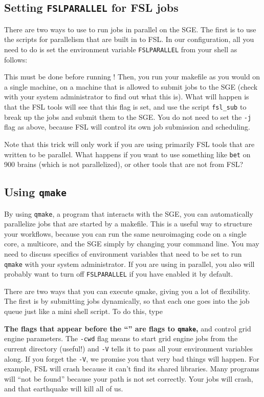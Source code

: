 \subsection{Setting \texttt{FSLPARALLEL} for FSL jobs}

There are two ways to use \maken{} to run jobs in parallel on the SGE. The first is to use the scripts for parallelism that are built in to FSL. In our configuration, all you need to do is set the environment variable \texttt{FSLPARALLEL} from your shell as follows:

This must be done before running \maken! Then, you run your makefile as you would on a single machine, on a machine that is allowed to submit jobs to the SGE (check with your system administrator to find out what this is). What will happen is that the FSL tools will see that this flag is set, and use the script \texttt{fsl_sub} to break up the jobs and submit them to the SGE. You do not need to set the \texttt{-j} flag as above, because FSL will control its own job submission and scheduling. 

Note that this trick will only work if you are using primarily FSL tools that are written to be parallel. What happens if you want to use something like \texttt{bet} on 900 brains (which is not parallelized), or other tools that are not from FSL?

\subsection{Using \texttt{qmake}}

By using \texttt{qmake}, a program that interacts with the SGE, you can automatically parallelize jobs that are started by a makefile. This is a useful way to structure your workflows, because you can run the same neuroimaging code on a single core, a multicore, and the SGE simply by changing your command line. You may need to discuss specifics of environment variables that need to be set to run \texttt{qmake} with your system administrator. If you are using \maken{} in parallel, you also will probably want to turn off \texttt{FSLPARALLEL} if you have enabled it by default.

There are two ways that you can execute qmake, giving you a lot of flexibility. The first is by submitting jobs dynamically, so that each one goes into the job queue just like a mini shell script. To do this, type

\textbf{The flags that appear before the ``\dd{}'' are flags to \texttt{qmake},} and control grid engine parameters. The \texttt{-cwd} flag means to start grid engine jobs from the current directory (useful!) and \texttt{-V} tells it to pass all your environment variables along. If you forget the \texttt{-V}, we promise you that very bad things will happen. For example, FSL will crash because it can't find its shared libraries. Many programs will ``not be found'' because your path is not set correctly. Your jobs will crash, and that earthquake will kill all of us.

